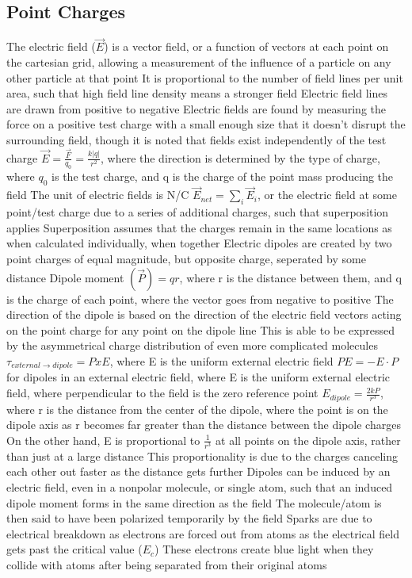 \documentclass[11 pt, twoside]{article}
\newenvironment{outline*}
{
	\begin{outline}[enumerate]
	}
	{\end{outline}
}
\begin{document}
\subsection{Point Charges}
\begin{outline*}
\1 The electric field ($\vec{E}$) is a vector field, or a function of vectors at each point on the cartesian grid, allowing a measurement of the influence of a particle on any other particle at that point
\2 It is proportional to the number of field lines per unit area, such that high field line density means a stronger field
\3 Electric field lines are drawn from positive to negative
\2 Electric fields are found by measuring the force on a positive test charge with a small enough size that it doesn't disrupt the surrounding field, though it is noted that fields exist independently of the test charge
\1 $\vec{E} = \frac{\vec{F}}{q_0} = \frac{k|q|}{r^2}$, where the direction is determined by the type of charge, where $q_0$ is the test charge, and q is the charge of the point mass producing the field
\2 The unit of electric fields is N/C
\2 $\vec{E}_{net} = \sum_i \vec{E}_i$, or the electric field at some point/test charge due to a series of additional charges, such that superposition applies
\3 Superposition assumes that the charges remain in the same locations as when calculated individually, when together
\1 Electric dipoles are created by two point charges of equal magnitude, but opposite charge, seperated by some distance
\2 Dipole moment $(\vec{P}) = qr$, where r is the distance between them, and q is the charge of each point, where the vector goes from negative to positive
\3 The direction of the dipole is based on the direction of the electric field vectors acting on the point charge for any point on the dipole line
\3 This is able to be expressed by the asymmetrical charge distribution of even more complicated molecules
\2 $\tau_{external \to dipole} = P x E$, where E is the uniform external electric field
\2 $PE = -E \cdot P$ for dipoles in an external electric field, where E is the uniform external electric field, where perpendicular to the field is the zero reference point
\2 $E_{dipole} = \frac{2kP}{r^3}$, where r is the distance from the center of the dipole, where the point is on the dipole axis as r becomes far greater than the distance between the dipole charges
\3 On the other hand, E is proportional to $\frac{1}{r^3}$ at all points on the dipole axis, rather than just at a large distance
\3 This proportionality is due to the charges canceling each other out faster as the distance gets further
\2 Dipoles can be induced by an electric field, even in a nonpolar molecule, or single atom, such that an induced dipole moment forms in the same direction as the field
\3 The molecule/atom is then said to have been polarized temporarily by the field
\1 Sparks are due to electrical breakdown as electrons are forced out from atoms as the electrical field gets past the critical value ($E_c$)
\2 These electrons create blue light when they collide with atoms after being separated from their original atoms
\end{outline*}
\end{document}
